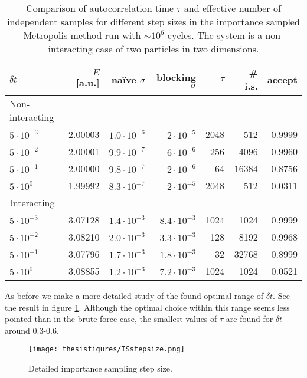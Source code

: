 \documentclass[twoside,english]{uiofysmaster}
\newcommand{\ra}[1]{\renewcommand{\arraystretch}{#1}}
\begin{document}
\begin{table*}\centering
\ra{1.3}
\caption{Comparison of autocorrelation time $\tau$ and effective number of independent samples for different step sizes in the importance sampled Metropolis method run with $\sim 10^6$ cycles. The system is a non-interacting case of two particles in two dimensions.}
\label{tab:ISstepsize}
\begin{tabular}{lrrrrrr}
\toprule
\toprule
$\delta t$ & $E$ [a.u.]  & na\"ive $\sigma$ & blocking $\sigma$ & $\tau$ &  \# i.s. & accept \\ 
\midrule 
Non-interacting \\
$5 \cdot 10^{-3}$ & 2.00003 & $1.0 \cdot 10^{-6}$ & $2 \cdot 10^{-5}$ & 2048  & 512   & 0.9999 \\
$5 \cdot 10^{-2}$ & 2.00001 & $9.9 \cdot 10^{-7}$ & $6 \cdot 10^{-6}$ & 256   & 4096  & 0.9960 \\
$5 \cdot 10^{-1}$ & 2.00000 & $9.8 \cdot 10^{-7}$ & $2 \cdot 10^{-6}$ & 64    & 16384 & 0.8756 \\
$5 \cdot 10^0$    & 1.99992 & $8.3 \cdot 10^{-7}$ & $2 \cdot 10^{-5}$ & 2048  & 512   & 0.0311 \\
Interacting \\
$5 \cdot 10^{-3}$ & 3.07128 & $1.4 \cdot 10^{-3}$ & $8.4 \cdot 10^{-3}$ & 1024  & 1024  & 0.9999 \\
$5 \cdot 10^{-2}$ & 3.08210 & $2.0 \cdot 10^{-3}$ & $3.3 \cdot 10^{-3}$ & 128   & 8192  & 0.9968 \\
$5 \cdot 10^{-1}$ & 3.07796 & $1.7 \cdot 10^{-3}$ & $1.8 \cdot 10^{-3}$ & 32    & 32768 & 0.8999 \\
$5 \cdot 10^0$    & 3.08855 & $1.2 \cdot 10^{-3}$ & $7.2 \cdot 10^{-3}$ & 1024  & 1024  & 0.0521 \\
\bottomrule
\bottomrule
\end{tabular}
\end{table*}


As before we make a more detailed study of the found optimal range of $\delta t$. See the result in figure \ref{fig:ISstepsize}. Although the optimal choice within this range seems less pointed than in the brute force case, the smallest values of $\tau$ are found for $\delta t$ around 0.3-0.6.

\begin{figure}
\centering
 \texttt{[image: thesisfigures/ISstepsize.png]}
 \caption{Detailed importance sampling step size.}
 \label{fig:ISstepsize}
\end{figure}
\end{document}
